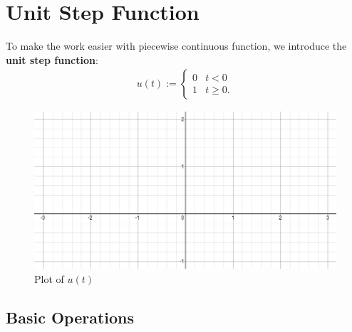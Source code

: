 \documentclass[12pt,a4paper]{article}
\begin{document}
	\newpage
	
	\section{Unit Step Function}
	To make the work easier with piecewise continuous function, we introduce the \textbf{unit step function}:
		\begin{align*}
		u(t) := \left\{
			\begin{matrix}
			0 & t < 0 \\
			1 & t \geq 0 .
			\end{matrix} \right.
		\end{align*}
	
	\vspace*{12pt}
	
	\begin{figure}[ht]
	\centering
	\includegraphics[scale=0.45]{GraphEmpty.png}
	\caption{Plot of $u(t)$}
	\end{figure}
	
	\subsection{Basic Operations}
	
\end{document}
